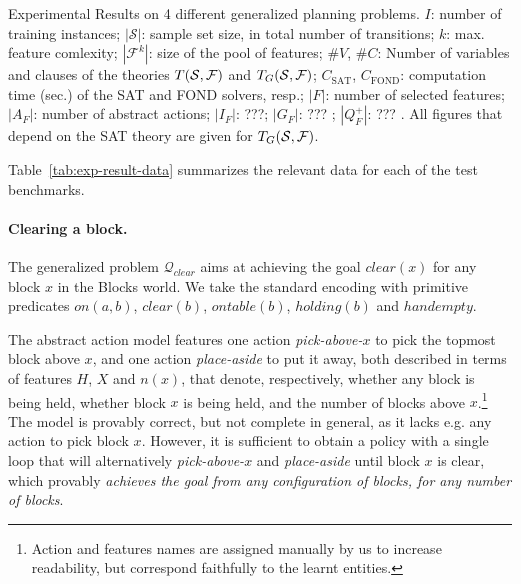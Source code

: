 \documentclass[letterpaper]{article} %
\newcommand{\abs}[1]{\ensuremath{\left\vert{#1}\right\vert}}
\newcommand{\Q}{\mathcal{Q}}
\begin{document}
\begin{table*}[t]
{}
\caption{{
  Experimental Results on 4 different generalized planning problems. 
  $I$: number of training instances; 
  $\abs{\mathcal{S}}$: sample set size, in total number of transitions; 
  $k$: max. feature comlexity; $\abs{\mathcal{F}^k}$: size of the pool of features;
  $\#V$, $\#C$: Number of variables and clauses of the theories $T({\cal S},{\cal F})$ and $T_G({\cal S},{\cal F})$;
  $C_{\text{SAT}}$, $C_{\text{FOND}}$: computation time (sec.) of the SAT and FOND solvers, resp.;
  $\abs{F}$: number of selected features;
  $\abs{A_F}$: number of abstract actions;
  $\abs{I_F}$: ???;
  $\abs{G_F}$: ??? ;
  $\abs{Q^+_F}$: ??? .
  All figures that depend on the SAT theory are given for $T_G({\cal S},{\cal F})$.
}}
\label{tab:exp-result-data}
\end{table*}


Table~\ref{tab:exp-result-data} summarizes the relevant data for each of the test benchmarks.


\paragraph{Clearing a block.}
The generalized problem $\Q_{clear}$ aims at achieving the goal $clear(x)$ for any block $x$
in the Blocks world. 
We take the standard encoding with primitive predicates $on(a, b)$, $clear(b)$, $ontable(b)$, $holding(b)$ and $handempty$.


The abstract action model features one action \emph{pick-above-$x$} to pick the topmost block above $x$,
and one action \emph{place-aside} to put it away, both described in terms of features $H$, $X$ and $n(x)$, 
that denote, respectively, whether any block is being held, whether block $x$ is being held,
and the number of blocks above $x$.\footnote{
Action and features names are assigned manually by us to increase readability, but correspond faithfully
to the learnt entities.
}
%
The model is provably correct, but not complete in general, as it lacks e.g.
any action to pick block $x$.
However, it is sufficient to obtain a policy with a single loop that will 
alternatively \emph{pick-above-$x$} and \emph{place-aside} until block $x$ is clear,
which provably \emph{achieves the goal from any configuration of blocks, for any number of blocks}.
\end{document}
